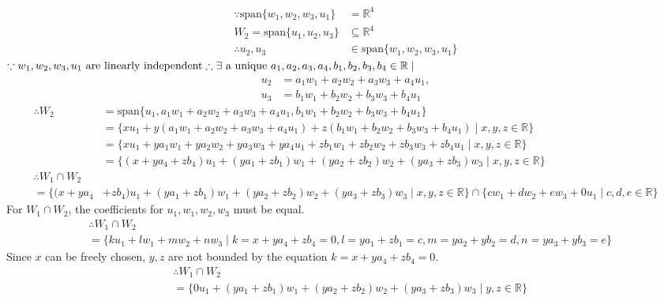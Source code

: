 \documentclass[10pt]{article}
\begin{document}
{{	%
		\begin{align}
			\because \text{span} \{w_1, w_2, w_3, u_1\} &= \mathbb{R}^4 \\
			W_2 = \text{span} \{u_1, u_2, u_3\} &\subseteq \mathbb{R}^4 \\
			\therefore u_2, u_3 &\in \text{span} \{w_1, w_2, w_3, u_1\}
		\end{align}
		\begin{math}
			\because w_1, w_2, w_3, u_1 \text{ are linearly independent} \\
			\therefore \exists \text{ a unique } a_1, a_2, a_3, a_4, b_1, b_2, b_3, b_4 \in \mathbb{R} \mid
		\end{math}
		\begin{align}
			u_2 &= a_1w_1 + a_2w_2 + a_3w_3 + a_4u_1, \\
			u_3 &= b_1w_1 + b_2w_2 + b_3w_3 + b_4u_1
		\end{align}
		\begin{align}
			\therefore W_2 &= \text{span} \{u_1, a_1w_1 + a_2w_2 + a_3w_3 + a_4u_1, b_1w_1 + b_2w_2 + b_3w_3 + b_4u_1\} \\
			&= \{xu_1 + y(a_1w_1 + a_2w_2 + a_3w_3 + a_4u_1) + z(b_1w_1 + b_2w_2 + b_3w_3 + b_4u_1) \mid x, y, z \in \mathbb{R}\} \\
			&= \{xu_1 + ya_1w_1 + ya_2w_2 + ya_3w_3 + ya_4u_1 + zb_1w_1 + zb_2w_2 + zb_3w_3 + zb_4u_1 \mid x, y, z \in \mathbb{R}\} \\
			&= \{(x + ya_4 + zb_4)u_1 + (ya_1 + zb_1)w_1 + (ya_2 + zb_2)w_2 + (ya_3 + zb_3)w_3 \mid x, y, z \in \mathbb{R}\} \\
			\therefore W_1 \cap W_2 & \\
			= \{(x + ya_4 &+ zb_4)u_1 + (ya_1 + zb_1)w_1 + (ya_2 + zb_2)w_2 + (ya_3 + zb_3)w_3 \mid x, y, z \in \mathbb{R}\} \cap \{cw_1 + dw_2 + ew_3 + 0u_1 \mid c, d, e \in \mathbb{R}\}
		\end{align}
		For $W_1 \cap W_2$, the coefficients for $u_1, w_1, w_2, w_3$ must be equal.
		\begin{align}
			&\therefore W_1 \cap W_2  \\
			&= \{ku_1 + lw_1 + mw_2 + nw_3 \mid k = x + ya_4 + zb_4 = 0, l = ya_1 + zb_1 = c, m = ya_2 + yb_2 = d, n = ya_3 + yb_3 = e\}
		\end{align}
		Since $x$ can be freely chosen, $y, z$ are not bounded by the equation $k = x + ya_4 + zb_4 = 0$.
		\begin{align}
			&\therefore W_1 \cap W_2 \\
			&= \{0u_1 + (ya_1 + zb_1)w_1 + (ya_2 + zb_2)w_2 + (ya_3 + zb_3)w_3 \mid y, z \in \mathbb{R}\} \\

\end{align}}}
\end{document}
